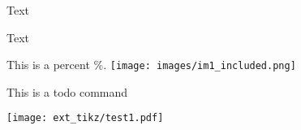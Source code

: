 
Text

Text%


This is a percent \%.
\texttt{[image: images/im1\_included.png]}

This is a todo command


\newif\ifvar

\ifvar
\fi



\texttt{[image: ext\_tikz/test1.pdf]}






